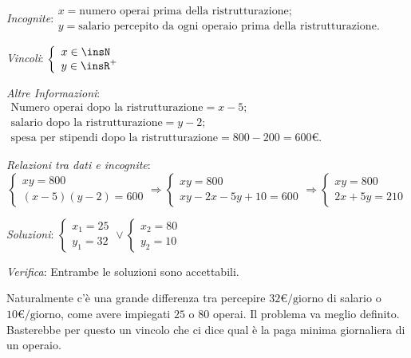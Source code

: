 \emph{Incognite}:\( \begin{array}{l}
x =\text{numero operai prima della ristrutturazione};\\
y= \text{salario percepito da ogni operaio prima della ristrutturazione}.
\end{array}\)

\emph{Vincoli}: \(\left\{\begin{array}{l}x\in \insN\\y\in \insR^+\end{array}\right.\)

\emph{Altre Informazioni}: \( \begin{array}{l}
\text{Numero operai dopo la ristrutturazione} = x-5;\\
\text{salario dopo la ristrutturazione} =y-2;\\
\text{spesa per stipendi dopo la ristrutturazione} =800-200=600\unit{\text{€}}.\end{array}\)

\emph{Relazioni tra dati e incognite}:
\begin{equation*}
\left\{\begin{array}{l}{{xy}=800}\\{(x-5)(y-2)=600}\end{array}\right.\Rightarrow \left\{\begin{array}{l}{{xy}=800}\\{{xy}-2x-5y+10=600}\end{array}\right.\Rightarrow \left\{\begin{array}{l}{{xy}=800}\\{2x+5y=210}\end{array}\right.
\end{equation*}

\emph{Soluzioni}: \(\left\{\begin{array}{l}{x_1=25}\\{y_1=32}\end{array}\right.\vee \left\{\begin{array}{l}{x_2=80}\\{y_2=10}\end{array}\right.\)

\emph{Verifica}: Entrambe le soluzioni sono accettabili.

Naturalmente c'è una grande differenza tra percepire \(32\unit{\text{€/giorno}}\) di salario o \( 10\unit{\text{€/giorno}} \), come avere impiegati \( 25 \) o \( 80 \) operai. Il problema va meglio definito. Basterebbe per questo un vincolo che ci dice qual è la paga minima giornaliera di un operaio.


